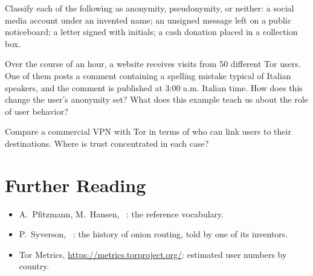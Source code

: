 \begin{esercizio}[1]\label{es:01-termini}
Classify each of the following as anonymity, pseudonymity, or neither: a social media account under an invented name; an unsigned message left on a public noticeboard; a letter signed with initials; a cash donation placed in a collection box.
\end{esercizio}

\begin{esercizio}[2]\label{es:01-insieme}
Over the course of an hour, a website receives visits from 50 different Tor users. One of them posts a comment containing a spelling mistake typical of Italian speakers, and the comment is published at 3:00 a.m. Italian time. How does this change the user's anonymity set? What does this example teach us about the role of user behavior?
\end{esercizio}

\begin{esercizio}[2]\label{es:01-vpn}
Compare a commercial VPN with Tor in terms of who can link users to their destinations. Where is trust concentrated in each case?
\end{esercizio}

\section*{Further Reading}
\begin{itemize}
  \item A.~Pfitzmann, M.~Hansen, ~\cite{pfitzmann2010terminology}: the reference vocabulary.
  \item P.~Syverson, ~\cite{syverson2011peel}: the history of onion routing, told by one of its inventors.
  \item Tor Metrics, \url{https://metrics.torproject.org/}: estimated user numbers by country.
\end{itemize}
